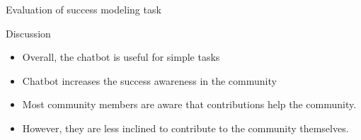 \begin{frame}{Evaluation of success modeling task}
 
      
   
   
\end{frame}

\begin{frame}{Discussion}
  \begin{itemize}
    \item Overall, the chatbot is useful for simple tasks
    \item Chatbot increases the success awareness in the community
    \item Most community members are aware that contributions help the community.
    \item However, they are less inclined to contribute to the community themselves.
    
  \end{itemize}
\end{frame}



